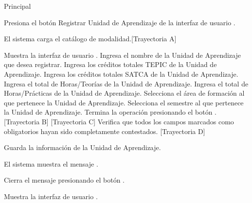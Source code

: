 \begin{UCtrayectoria}{Principal}

    \UCpaso[\UCactor] Presiona el botón Registrar Unidad de Aprendizaje de la interfaz de usuario .

    \UCpaso El sistema carga el catálogo de modalidad.[Trayectoria A]


    \UCpaso Muestra la interfaz de usuario .
    \UCpaso[\UCactor] Ingresa el nombre de la Unidad de Aprendizaje que desea registrar.
    \UCpaso[\UCactor] Ingresa los créditos totales TEPIC de la Unidad de Aprendizaje.
    \UCpaso[\UCactor] Ingresa los créditos totales SATCA de la Unidad de Aprendizaje.
    \UCpaso[\UCactor] Ingresa el total de Horas/Teorías de la Unidad de Aprendizaje.
    \UCpaso[\UCactor] Ingresa el total de Horas/Prácticas de la Unidad de Aprendizaje.
    \UCpaso[\UCactor] Selecciona el área de formación al que pertenece la Unidad de Aprendizaje.
    \UCpaso[\UCactor] Selecciona el semestre al que pertenece la Unidad de Aprendizaje.
    \UCpaso[\UCactor] Termina la operación presionando el botón . [Trayectoria B] [Trayectoria C]
    \UCpaso Verifica que todos los campos marcados como obligatorios hayan sido completamente contestados. [Trayectoria D]

    \UCpaso Guarda la información de la Unidad de Aprendizaje.

    \UCpaso El sistema muestra el mensaje .

    \UCpaso[\UCactor] Cierra el mensaje presionando el botón .

    \UCpaso Muestra la interfaz de usuario .
\end{UCtrayectoria}


\begin{comment}
\begin{UCtrayectoriaA}{A}{El sistema no encuentra ningún formulario para mostrar.}
	\UCpaso No encuentra ningún formulario para mostrar.
    \UCpaso El sistema muestra el mensaje \MSGref{MSG6}{Por el momento no se puede registrar la bibliografía}.
    \UCpaso[\UCactor] Cierra el mensaje presionando el botón \IUbutton{Aceptar}.
    \UCpaso Continua en el paso 1 de la trayectoria principal del \UCref{CU1}.
\end{UCtrayectoriaA}
\end{comment}

